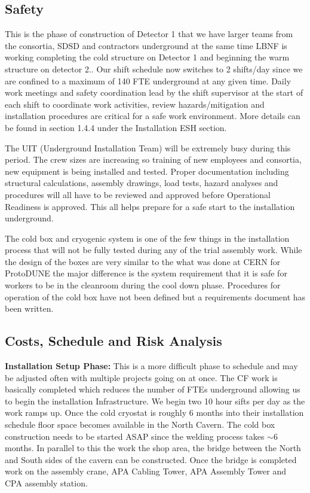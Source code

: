 \subsection{Safety}
\label{sec:fdsp-tc-infr-safety}
This is the phase of construction of Detector 1 that we have larger teams from the consortia, SDSD  and contractors underground at the same time LBNF is working completing the cold structure on Detector 1 and beginning the warm structure on detector 2.. Our shift schedule now switches to 2 shifts/day since we are confined to a maximum of 140 FTE underground at any given time.  Daily work meetings and safety coordination lead by the shift supervisor at the start of each shift to coordinate work activities, review hazards/mitigation and installation procedures are critical for a safe work environment. More details can be found in section 1.4.4 under the Installation ESH section. 

The UIT (Underground Installation Team) will be extremely busy during this period. The crew sizes are increasing so training of new employees and consortia, new equipment is being installed and tested. Proper documentation including structural calculations, assembly drawings, load tests, hazard analyses and procedures will all have to be reviewed and approved before Operational Readiness is approved. This all helps prepare for a safe start to the installation underground. 

The cold box and cryogenic system is one of the few things in the installation process that will not be fully tested during any of the trial assembly work. While the design of the boxes are very similar to the what was done at CERN for ProtoDUNE the major difference is the system requirement that it is safe for workers to be in the cleanroom during the cool down phase. Procedures for operation of the cold box have not been defined but a requirements document has been written.   

\subsection{Costs, Schedule and Risk Analysis}
\label{sec:fdsp-tc-infr-cost}


{\bf Installation Setup Phase:} This is a more difficult phase to schedule and may be adjusted often with multiple projects going on at once. The CF work is basically completed which reduces the number of FTEs underground allowing us to begin the installation Infrastructure. We begin two 10 hour sifts per day as the work ramps up.  Once the cold cryostat is roughly 6 months into their installation schedule floor space becomes available in the North Cavern. The cold box construction needs to be started ASAP since the welding process takes $\sim6$ months. In parallel to this the work the shop area, the bridge between the North and South sides of the cavern can be constructed. Once the bridge is completed work on the assembly crane, APA Cabling Tower, APA Assembly Tower and CPA assembly station. 
    
